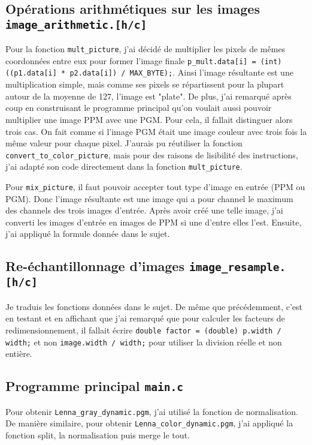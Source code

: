\documentclass[a4paper,12pt]{article}
\begin{document}
\subsection{Opérations arithmétiques sur les images \texttt{image\_arithmetic.[h/c]}}
Pour la fonction \texttt{mult\_picture}, j'ai décidé de multiplier les pixels de mêmes coordonnées entre eux pour former l'image finale \texttt{p\_mult.data[i] = (int) ((p1.data[i] * p2.data[i]) / MAX\_BYTE);}. Ainsi l'image résultante est une multiplication simple, mais comme ses pixels se répartissent pour la plupart autour de la moyenne de 127, l'image est "plate". De plus, j'ai remarqué après coup en construisant le programme principal qu'on voulait aussi pouvoir multiplier une image PPM avec une PGM. Pour cela, il fallait distinguer alors trois cas. On fait comme si l'image PGM était une image couleur avec trois fois la même valeur pour chaque pixel. J'aurais pu réutiliser la fonction \texttt{convert\_to\_color\_picture}, mais pour des raisons de lisibilité des instructions, j'ai adapté son code directement dans la fonction \texttt{mult\_picture}.

Pour \texttt{mix\_picture}, il faut pouvoir accepter tout type d'image en entrée (PPM ou PGM). Donc l'image résultante est une image qui a pour channel le maximum des channels des trois images d'entrée. Après avoir créé une telle image, j'ai converti les images d'entrée en images de PPM si une d'entre elles l'est. Ensuite, j'ai appliqué la formule donnée dans le sujet.

\subsection{Re-échantillonnage d'images \texttt{image\_resample.[h/c]}}
Je traduis les fonctions données dans le sujet. De même que précédemment, c'est en testant et en affichant que j'ai remarqué que pour calculer les facteurs de redimensionnement, il fallait écrire \texttt{double factor = (double) p.width / width;} et non \texttt{image.width / width;} pour utiliser la division réelle et non entière.

\subsection{Programme principal \texttt{main.c}}

Pour obtenir \texttt{Lenna\_gray\_dynamic.pgm}, j'ai utilisé la fonction de normalisation. De manière similaire, pour obtenir \texttt{Lenna\_color\_dynamic.pgm}, j'ai appliqué la fonction split, la normalisation puis merge le tout.
\end{document}
